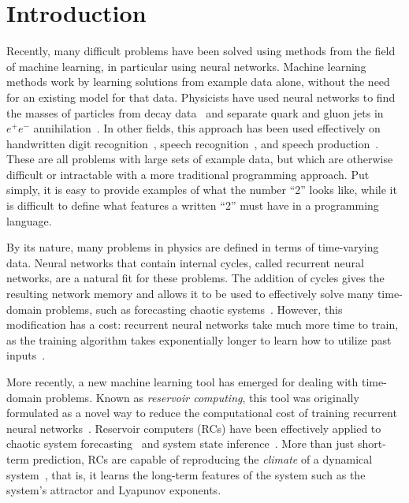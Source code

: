 \chapter{Introduction}\label{ch:introduction}


Recently, many difficult problems have been solved using methods from
the field of machine learning, in particular using neural
networks. Machine learning methods work by learning solutions from
example data alone, without the need for an existing model for that
data.  Physicists have used neural networks to find the masses of
particles from decay data~\cite{lonnblad1992} and separate quark and
gluon jets in $e^+ e^-$ annihilation~\cite{csabai1991}.  In other
fields, this approach has been used effectively on handwritten digit
recognition~\cite{lecun1998,simard2003}, speech
recognition~\cite{hinton2012}, and speech production~\cite{oord2016}.
These are all problems with large sets of example data, but which are
otherwise difficult or intractable with a more traditional programming
approach. Put simply, it is easy to provide examples of what the
number ``\num{2}'' looks like, while it is difficult to define what
features a written ``\num{2}'' must have in a programming language.

By its nature, many problems in physics are defined in terms of
time-varying data. Neural networks that contain internal cycles,
called recurrent neural networks, are a natural fit for these
problems. The addition of cycles gives the resulting network memory
and allows it to be used to effectively solve many time-domain
problems, such as forecasting chaotic
systems~\cite{garcia-pedrero2010}. However, this modification has a
cost: recurrent neural networks take much more time to train, as the
training algorithm takes exponentially longer to learn how to utilize
past inputs~\cite{bengio1994,lukosevicius2009}.

More recently, a new machine learning tool has emerged for dealing
with time-domain problems.  Known as \emph{reservoir computing}, this
tool was originally formulated as a novel way to reduce the
computational cost of training recurrent neural
networks~\cite{lukosevicius2009}. Reservoir computers (RCs) have been
effectively applied to chaotic system
forecasting~\cite{jaeger2004,pathak2017} and system state
inference~\cite{lu2017}. More than just short-term prediction, RCs are
capable of reproducing the \emph{climate} of a dynamical
system~\cite{pathak2017,haluszczynski2019}, that is, it learns the long-term
features of the system such as the system's attractor and Lyapunov
exponents.

